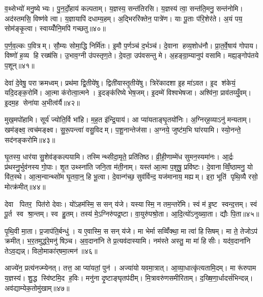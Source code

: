 व॒थ्सेभ्यो॑ मनु॒ष्येभ्यः। पु॒न॒र्दो॒हाय॑ कल्पताम्। य॒ज्ञस्य॒ सन्त॑तिरसि। य॒ज्ञस्य॑ त्वा॒ सन्त॑ति॒मनु॒ सन्त॑नोमि। अद॑स्तमसि॒ विष्ण॑वे त्वा। य॒ज्ञायापि॑ दधाम्य॒हम्। अ॒द्भिररि॑क्तेन॒ पात्रे॑ण। याः पू॒ताः प॑रि॒शेर॑ते। अ॒यं पय॒ सोम॑ङ्कृ॒त्वा। स्वाय्योँनि॒मपि॑ गच्छतु॥४०॥

प॒र्ण॒व॒ल्कः प॒वित्रम्। सौ॒म्यः सोमा॒द्धि निर्मि॑तः। इ॒मौ प॒र्णञ्च॑ द॒र्भञ्च॑। दे॒वाना हव्य॒शोध॑नौ। प्रा॒त॒र्वे॒षाय॑ गोपाय। विष्णो॑ ह॒व्य हि रख्ष॑सि। उ॒भाव॒ग्नी उ॑पस्तृण॒ते। दे॒वता॒ उप॑वसन्तु मे। अ॒हङ्ग्रा॒म्यानुप॑ वसामि। मह्य॒ङ्गोप॑तये प॒शून्॥४१॥\anuvakamend[आभृ॑त इ॒मङ्गृ॑ह्णामि॒ पूर्व॒स्ताः पूर्व॒ परि॑गृह्णामि सभापा॒ला इन्द्र॑ज्येष्ठेभ्य॒ आदि॑त्य व्रतपते सुस॒म्भृता॑ मे स॒ह पु॑नातु गहि नो वि॒श्वरू॑पा दधातु॒ पुन॑र्गच्छतु प॒शून् (याःपु॒रस्ता॑दि॒मामूर्ज॑मि॒ह प्र॒जा इ॒ह प॒शवो॒ऽयं पि॑तृ॒णाम॒ग्निः। )]

देवा॑ दे॒वेषु॒ पराक्रमध्वम्। प्रथ॑मा द्वि॒तीये॑षु। द्विती॑यास्तृ॒तीये॑षु। त्रिरे॑कादशा इ॒ह मा॑ऽवत। इ॒द श॑केयं॒ यदि॒दङ्क॒रोमि॑। आ॒त्मा क॑रोत्वा॒त्मने। इ॒दङ्क॑रिष्ये भेष॒जम्। इ॒दम्मे॑ विश्वभेषजा। अश्वि॑ना॒ प्राव॑तय्युँ॒वम्। इ॒दम॒ह सेना॑या अ॒भीत्व॑र्यै॥४२॥

मुख॒मपो॑हामि। सूर्य॑ ज्योति॒र्वि भा॑हि। म॒ह॒त इ॑न्द्रि॒याय॑। आ प्या॑यताङ्घृ॒तयो॑निः। अ॒ग्निर्‌ह॒व्याऽनु॑ मन्यताम्। खम॑ङ्क्ष्व॒ त्वच॑मङ्क्ष्व। सु॒रू॒पन्त्वा॑ वसु॒विदम्। प॒शू॒नान्तेज॑सा। अ॒ग्नये॒ जुष्ट॑म॒भि घा॑रयामि। स्यो॒नन्ते॒ सद॑नङ्करोमि॥४३॥

घृ॒तस्य॒ धार॑या सु॒शेव॑ङ्कल्पयामि। तस्मिन्थ्सीदा॒मृते॒ प्रति॑तिष्ठ। व्री॒ही॒णाम्मे॑ध सुमन॒स्यमा॑नः। आ॒र्द्रः प्र॑थस्नु॒र्भुव॑नस्य गो॒पाः। शृ॒त उथ्स्ना॑ति जनि॒ता म॑ती॒नाम्। यस्त॑ आ॒त्मा प॒शुषु॒ प्रवि॑ष्टः। दे॒वानाव्विँ॒ष्ठामनु॒ यो वि॑त॒स्थे। आ॒त्म॒न्वान्थ्सो॑म घृ॒तवा॒न्॒ हि भू॒त्वा। दे॒वान्ग॑च्छ॒ सुव॑र्विन्द॒ यज॑मानाय॒ मह्यम्। इरा॒ भूति॑ पृथि॒व्यै रसो॒ मोत्क्र॑मीत्॥४४॥

देवा पितर॒ पित॑रो देवाः। यो॑ऽहम॑स्मि॒ स सन् य॑जे। यस्यास्मि॒ न तम॒न्तरे॑मि। स्वं म॑ इ॒ष्ट स्वन्द॒त्तम्। स्वं पू॒र्त स्व श्रा॒न्तम्। स्व हु॒तम्। तस्य॑ मे॒ऽग्निरु॑पद्र॒ष्टा। वा॒युरु॑पश्रो॒ता। आ॒दि॒त्यो॑ऽनुख्या॒ता। द्यौः पि॒ता॥४५॥

पृ॒थि॒वी मा॒ता। प्र॒जाप॑ति॒र्बन्धु॑। य ए॒वास्मि॒ स सन् य॑जे। मा भेर्मा सव्विँ॑क्था॒ मा त्वा॑ हिसिषम्। मा ते॒ तेजोऽप॑ क्रमीत्। भ॒र॒तमुद्ध॑रे॒मनु॑ षिञ़्च। अ॒व॒दाना॑नि ते प्र॒त्यव॑दास्यामि। नम॑स्ते अस्तु॒ मा मा॑ हिसीः। यद॑व॒दाना॑नि तेऽव॒द्यन्न्। विलो॒माका॑र्‌षमा॒त्मन॑॥४६॥

आज्ये॑न॒ प्रत्य॑नज्म्येनत्। तत्त॒ आ प्या॑यतां॒ पुन॑। अज्या॑यो यवमा॒त्रात्। आ॒व्या॒धात्कृ॑त्यतामि॒दम्। मा रू॑रुपाम य॒ज्ञस्य॑। शु॒द्ध स्वि॑ष्टमि॒द ह॒विः। मनु॑ना दृ॒ष्टाङ्घृतप॑दीम्। मि॒त्रावरु॑णसमीरिताम्। द॒ख्षि॒णा॒र्धादसं॑भिन्दन्न्। अव॑द्याम्येक॒तोमु॑खाम्॥४७॥

